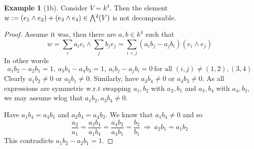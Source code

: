 \documentclass{scrartcl}
\newcommand{\extpow}{\mathchoice{{\textstyle\bigwedge}}
    {{\bigwedge}}
    {{\textstyle\wedge}}
    {{\scriptstyle\wedge}}}
\theoremstyle{definition}
\newtheorem{example}[definition]{Example}
\begin{document}
\begin{example}[1b]
    Consider $V = k^4$. 
    Then the element $w := (e_1 \wedge e_2) + (e_3 \wedge e_4) \in \extpow^2(V)$ is not decomposable. 
\end{example}
\begin{proof}
    Assume it was, then there are $a, b \in k^4$ such that
    \begin{equation*}
        w = \sum_i a_i e_i \wedge \sum_j b_j e_j = \sum_{i < j} (a_i b_j - a_j b_i) (e_i \wedge e_j)
    \end{equation*}
    In other words
    \begin{equation*}
        a_1b_2 - a_2b_1 = 1, \ a_3b_4 - a_4b_3 = 1, \ a_i b_j - a_j b_i = 0 \ \text{for all $(i, j) \neq (1, 2), (3, 4)$}
    \end{equation*}
    Clearly $a_1 b_2 \neq 0$ or $a_2 b_1 \neq 0$.
    Similarly, have $a_3 b_4 \neq 0$ or $a_4 b_3 \neq 0$.
    As all expressions are symmetric w.r.t swapping $a_1, b_2$ with $a_2, b_1$ and $a_3, b_4$ with $a_4, b_3$, we may assume wlog that $a_1 b_2, a_3 b_4 \neq 0$.

    Have $a_1 b_4 = a_4 b_1$ and $a_2 b_4 = a_4 b_2$.
    We know that $a_1 b_4 \neq 0$ and so
    \begin{equation*}
        \frac {a_2} {a_1} = \frac {a_2 b_4} {a_1 b_4} = \frac {a_4 b_2} {a_4 b_1} = \frac {b_2} {b_1} \ \Rightarrow \ a_2 b_1 = a_1 b_2
    \end{equation*}
    This contradicts $a_1 b_2 - a_2 b_1 = 1$.
\end{proof}
\end{document}
